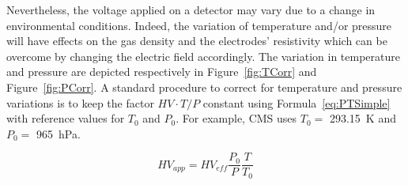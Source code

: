 	Nevertheless, the voltage applied on a detector may vary due to a change in environmental conditions. Indeed, the variation of temperature and/or pressure will have effects on the gas density and the electrodes' resistivity which can be overcome by changing the electric field accordingly. The variation in temperature and pressure are depicted respectively in Figure~\ref{fig:TCorr} and Figure~\ref{fig:PCorr}. A standard procedure to correct for temperature and pressure variations is to keep the factor $HV\cdot T/P$ constant using Formula~\ref{eq:PTSimple}~\cite{ABBRESCIA1995,ABBRESCIA1997PRES} with reference values for $T_0$ and $P_0$. For example, CMS uses $T_0=$ \SI{293.15}{K} and $P_0=$ \SI{965}{hPa}.
	
	\begin{equation}
	\label{eq:PTSimple}
	HV_{app} = HV_{eff}\frac{P_0}{P}\frac{T}{T_0}
	\end{equation}
	
